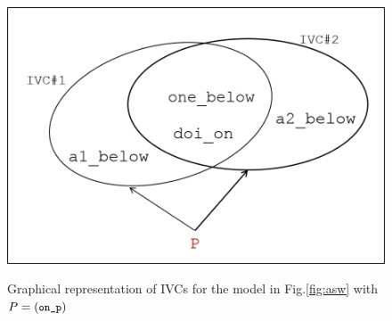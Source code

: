 \begin{figure}[t]
 \centering
  \includegraphics[width=0.65\columnwidth]{figs/ivcs.png}
  \label{fig:ivcs}
  \vspace{-0.1in}
  \caption{Graphical representation of IVCs for the model in Fig.\ref{fig:asw} with  $P = (\small{\texttt{on\_p}})$}
\end{figure}





